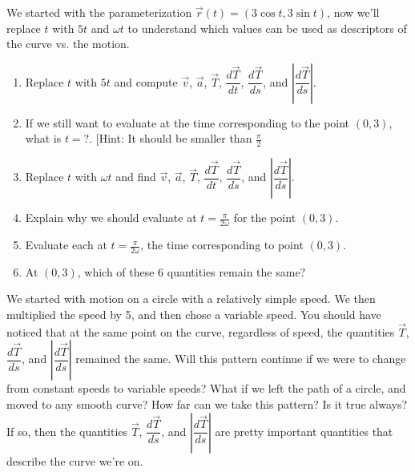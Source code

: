 \begin{problem}
We started with the parameterization $\vec r(t) = (3\cos t, 3\sin t)$, now we'll replace $t$ with $5t$ and $\omega t$ to understand which values can be used as descriptors of the curve vs. the motion. 
\begin{enumerate}
	\item Replace $t$ with $5t$ and compute $\vec v$, $\vec a$, $\vec T$, $\dfrac{d\vec T}{dt}$, $\dfrac{d\vec T}{ds}$, and $\left|\dfrac{d\vec T}{ds}\right|$. 
	\item If we still want to evaluate at the time corresponding to the point $(0,3)$, what is $t=$?. [Hint: It should be smaller than $\frac{\pi}{2}$
	\item Replace $t$ with $\omega t$ and find $\vec v$, $\vec a$, $\vec T$, $\dfrac{d\vec T}{dt}$, $\dfrac{d\vec T}{ds}$, and $\left|\dfrac{d\vec T}{ds}\right|$. 
	\item Explain why we should evaluate at $t=\frac{\pi}{2\omega}$ for the point $(0,3)$.
	\item Evaluate each at $t=\frac{\pi}{2\omega}$, the time corresponding to point $(0,3)$.
	\item At $(0,3)$, which of these 6 quantities remain the same?
\end{enumerate}
\end{problem}


We started with motion on a circle with a relatively simple speed.  We then multiplied the speed by 5, and then chose a variable speed.  You should have noticed that at the same point on the curve, regardless of speed, the quantities $\vec T$, $\dfrac{d\vec T}{ds}$, and $\left|\dfrac{d\vec T}{ds}\right|$ remained the same. Will this pattern continue if we were to change from constant speeds to variable speeds?  What if we left the path of a circle, and moved to any smooth curve? How far can we take this pattern?  Is it true always?  If so, then the quantities $\vec T$, $\dfrac{d\vec T}{ds}$, and $\left|\dfrac{d\vec T}{ds}\right|$ are pretty important quantities that describe the curve we're on. 

